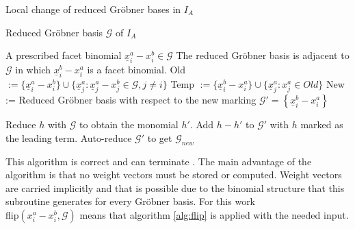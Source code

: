 \begin{algorithm}
\caption{Local change of reduced Gröbner bases in $I_A$ \cite{tigers}}
\label{alg:flip}
\begin{algorithmic}[1]

\Input
Reduced Gröbner basis $ \mathcal{G} $ of $I_A$

    A prescribed facet binomial $ \underline{x}^{a}_{i} - x^{b}_{i} \in \mathcal{G} $
\Output The reduced Gröbner basis is adjacent to $\mathcal{G}$ in which $ \underline{x}^{b}_{i} - x^{a}_{i} $ is a facet binomial.
\State Old 
$:= \lbrace \underline{x}^{a}_{i} - x^{b}_{i} \rbrace \cup
 \lbrace \underline{x}^{a}_{j} : \underline{x}^{a}_{j} - x^{b}_{j} \in \mathcal{G},
 j \neq i \rbrace $ 
 \State Temp $:= \lbrace \underline{x}^{b}_{i} - x^{a}_{i} \rbrace \cup 
 \lbrace \underline{x}^{a}_{j} : x^{a}_{j} \in Old  \rbrace $
 \State New := Reduced Gröbner basis with respect to the new marking 
 \State $\mathcal{G}' = \left\lbrace \underline{x}^{b}_{i} - x^{a}_{i} \right\rbrace  $
 
 \State Reduce $h$ with $\mathcal{G}$ to obtain the monomial $h'$.
 \State Add $h-h'$ to $\mathcal{G}'$ with $h$ marked as the leading term.
 \EndFor
 \State Auto-reduce $\mathcal{G}'$ to get $\mathcal{G}_{new}$

\end{algorithmic}
\end{algorithm}

This algorithm is correct and can terminate \cite{tigers}.
The main advantage of the algorithm is that no weight vectors must be stored or computed.
Weight vectors are carried implicitly and that is possible due to the binomial structure that this subroutine generates for every Gröbner basis. For this work \\ flip$({x}^{a}_{i} - x^{b}_{i},\mathcal{G})$ means that algorithm \ref{alg:flip} is applied with the needed input.

